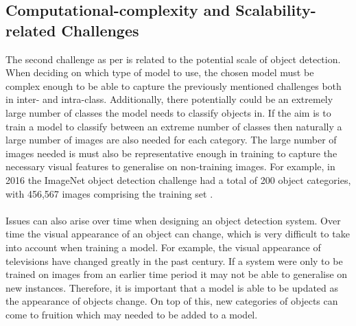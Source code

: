 \subsection{Computational-complexity and Scalability-related Challenges}
The second challenge as per \cite{zhang} is related to the potential scale of object detection. When deciding on which type of model to use, the chosen model must be complex enough to be able to capture the previously mentioned challenges both in inter- and intra-class. Additionally, there potentially could be an extremely large number of classes the model needs to classify objects in. If the aim is to train a model to classify between an extreme number of classes then naturally a large number of images are also needed for each category. The large number of images needed is must also be representative enough in training to capture the necessary visual features to generalise on non-training images. For example, in 2016 the ImageNet object detection challenge had a total of 200 object categories, with 456,567 images comprising the training set \cite{zhang}.
\\\\
Issues can also arise over time when designing an object detection system.  Over time the visual appearance of an object can change, which is very difficult to take into account when training a model. For example, the visual appearance of televisions have changed greatly in the past century. If a system were only to be trained on images from an earlier time period it may not be able to generalise on new instances. Therefore, it is important that a model is able to be updated as the appearance of objects change. On top of this, new categories of objects can come to fruition which may needed to be added to a model. 

